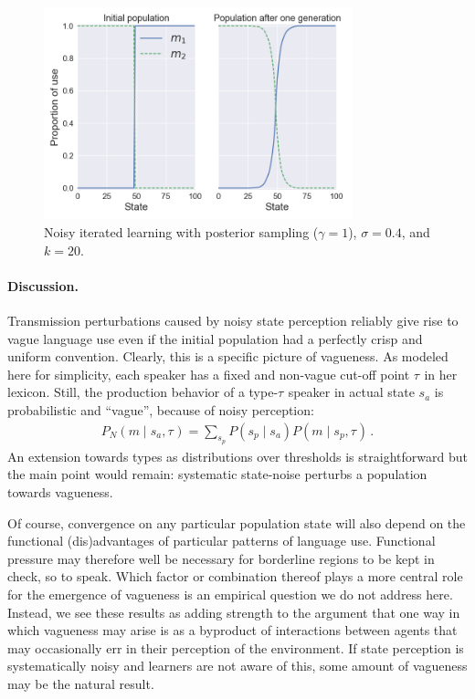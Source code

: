 \documentclass[10pt,a4paper]{article}
\newcommand{\type}[1]{\ensuremath{\tau_{#1}}}
\newcommand{\postparameter}{\ensuremath{\gamma}}
\begin{document}
\begin{figure}[ht]
\centering
    \includegraphics[width=\textwidth,height=6.15cm, keepaspectratio]{../code/plots/vag-side-by-side.png}
\caption{Noisy iterated learning with posterior sampling ($\postparameter=1$), $\sigma = 0.4$, and $k = 20$.}
  \label{fig:vag}
\end{figure}
 
\paragraph{Discussion.}
Transmission perturbations caused by noisy state perception reliably give rise to vague
language use even if the initial population had a perfectly crisp and uniform
convention. Clearly, this is a specific picture of vagueness. As modeled here for simplicity,
each speaker has a fixed and non-vague cut-off point $\type{}$ in her lexicon. Still, the production
behavior of a type-$\type{}$ speaker in actual state $s_a$ is probabilistic and ``vague'', because of
noisy perception:
\begin{align*}
  P_N(m \mid s_a, \type{}) = \sum_{s_p} P(s_p \mid s_a) P(m \mid s_p, \type{})\,.
\end{align*}
An extension towards types as distributions over thresholds is straightforward but the main
point would remain: systematic state-noise perturbs a population towards vagueness. 

Of course, convergence on any particular population state will also depend on the functional
(dis)advantages of particular patterns of language use. Functional pressure may therefore well
be necessary for borderline regions to be kept in check, so to speak. Which factor or
combination thereof plays a more central role for the emergence of vagueness is an empirical
question we do not address here. Instead, we see these results as adding strength to the
argument that one way in which vagueness may arise is as a byproduct of interactions between
agents that may occasionally err in their perception of the environment. If state perception is
systematically noisy and learners are not aware of this, some amount of vagueness may be the
natural result.
\end{document}
